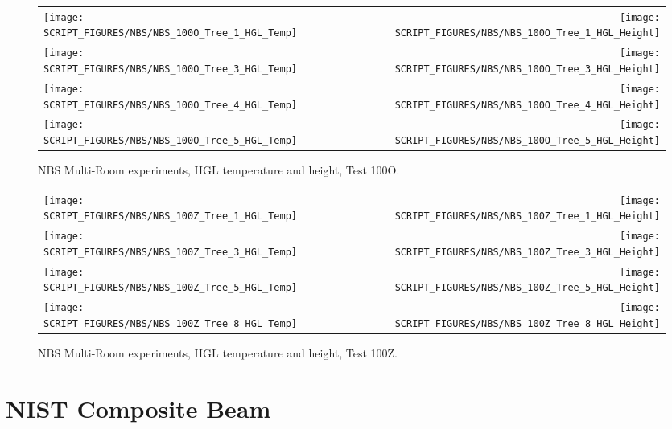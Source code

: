 \begin{figure}[p]
\begin{tabular*}{\textwidth}{l@{\extracolsep{\fill}}r}
\texttt{[image: SCRIPT\_FIGURES/NBS/NBS\_100O\_Tree\_1\_HGL\_Temp]} &
\texttt{[image: SCRIPT\_FIGURES/NBS/NBS\_100O\_Tree\_1\_HGL\_Height]} \\
\texttt{[image: SCRIPT\_FIGURES/NBS/NBS\_100O\_Tree\_3\_HGL\_Temp]} &
\texttt{[image: SCRIPT\_FIGURES/NBS/NBS\_100O\_Tree\_3\_HGL\_Height]} \\
\texttt{[image: SCRIPT\_FIGURES/NBS/NBS\_100O\_Tree\_4\_HGL\_Temp]} &
\texttt{[image: SCRIPT\_FIGURES/NBS/NBS\_100O\_Tree\_4\_HGL\_Height]} \\
\texttt{[image: SCRIPT\_FIGURES/NBS/NBS\_100O\_Tree\_5\_HGL\_Temp]} &
\texttt{[image: SCRIPT\_FIGURES/NBS/NBS\_100O\_Tree\_5\_HGL\_Height]}
\end{tabular*}
\caption[NBS Multi-Room experiments, HGL temperature and height, Test 100O]
{NBS Multi-Room experiments, HGL temperature and height, Test 100O.}
\label{NBS_HGL_2}
\end{figure}

\begin{figure}[p]
\begin{tabular*}{\textwidth}{l@{\extracolsep{\fill}}r}
\texttt{[image: SCRIPT\_FIGURES/NBS/NBS\_100Z\_Tree\_1\_HGL\_Temp]} &
\texttt{[image: SCRIPT\_FIGURES/NBS/NBS\_100Z\_Tree\_1\_HGL\_Height]} \\
\texttt{[image: SCRIPT\_FIGURES/NBS/NBS\_100Z\_Tree\_3\_HGL\_Temp]} &
\texttt{[image: SCRIPT\_FIGURES/NBS/NBS\_100Z\_Tree\_3\_HGL\_Height]} \\
\texttt{[image: SCRIPT\_FIGURES/NBS/NBS\_100Z\_Tree\_5\_HGL\_Temp]} &
\texttt{[image: SCRIPT\_FIGURES/NBS/NBS\_100Z\_Tree\_5\_HGL\_Height]} \\
\texttt{[image: SCRIPT\_FIGURES/NBS/NBS\_100Z\_Tree\_8\_HGL\_Temp]} &
\texttt{[image: SCRIPT\_FIGURES/NBS/NBS\_100Z\_Tree\_8\_HGL\_Height]}
\end{tabular*}
\caption[NBS Multi-Room experiments, HGL temperature and height, Test 100Z]
{NBS Multi-Room experiments, HGL temperature and height, Test 100Z.}
\label{NBS_HGL_3}
\end{figure}

\clearpage


\section{NIST Composite Beam}

